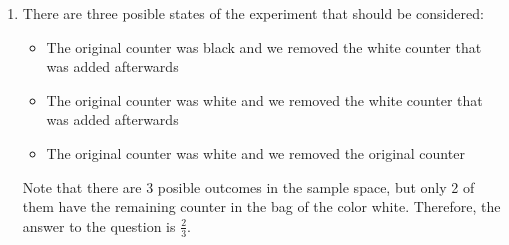 \documentclass{article}
\begin{document}
\begin{enumerate}
	\item There are three posible states of the experiment that should be considered:
	      \begin{itemize}
		      \item The original counter was black and we removed the white counter that was added afterwards
		      \item The original counter was white and we removed the white counter that was added afterwards
		      \item The original counter was white and we removed the original counter
	      \end{itemize}
	      Note that there are 3 posible outcomes in the sample space, but only 2 of them have the remaining counter in the bag of the color white. Therefore, the answer to the question is \(\frac{2}{3}\).
\end{enumerate}
\end{document}
